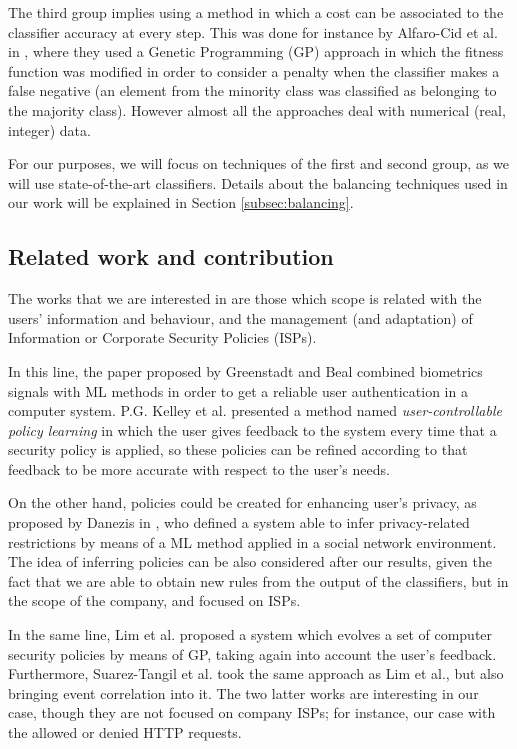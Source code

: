 \documentclass{llncs}
\begin{document}
The third group implies using a method in which a cost can be associated to the classifier accuracy at every step. This was done for instance by Alfaro-Cid et al. in \cite{cost_adjustment_07}, where they used a Genetic Programming (GP) approach in which the fitness function was modified in order to consider a penalty when the classifier makes a false negative (an element from the minority class was classified as belonging to the majority class).
However almost all the approaches deal with numerical (real, integer)
data. 

For our purposes, we will focus on techniques of the first and second group, as we will use state-of-the-art classifiers. Details about the balancing techniques used in our work will be explained in Section \ref{subsec:balancing}. 

%
\subsection{Related work and contribution}
\label{subsec:relatedworks}

The works that we are interested in are those which scope is related with the users' information and behaviour, and the management (and adaptation) of Information or Corporate Security Policies (ISPs).

In this line, the paper proposed by Greenstadt and Beal \cite{cognitive_security_08} combined biometrics signals with ML methods in order to get a reliable user authentication in a computer system. P.G. Kelley et al. \cite{user-controllable_learning_08} presented a method named \textit{user-controllable policy learning} in which the user gives feedback to the system every time that a security policy is applied, so these policies can be refined according to that feedback to be more accurate with respect to the user's needs. 

On the other hand, policies could be created for enhancing user's privacy, as proposed by Danezis in \cite{inferring_policies_socialnetworks_09}, who defined a system able to infer privacy-related restrictions by means of a ML method applied in a social network environment. The idea of inferring policies can be also considered after our results, given the fact that we are able to obtain new rules from the output of the classifiers, but in the scope of the company, and focused on ISPs.

In the same line, Lim et al. proposed a system \cite{sec_policy_evolution_gp_08,pol_evol_gp_3_approaches_08} which evolves a set of computer security policies by means of GP, taking again into account the user's feedback. Furthermore, Suarez-Tangil et al. \cite{rule_generation_gp_09} took the same approach as Lim et al., but also bringing event correlation into it. The two latter works are interesting in our case, though they are not focused on company ISPs; for instance, our case with the allowed or denied HTTP requests.
\end{document}
